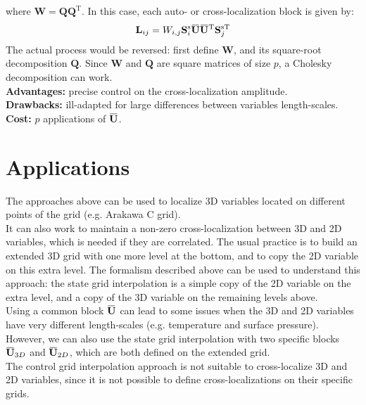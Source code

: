 \documentclass[12pt]{scrartcl}
\newcommand{\overbar}[1]{\mkern 1.5mu\overline{\mkern-1.5mu#1\mkern-1.5mu}\mkern 1.5mu}
\begin{document}
where $\mathbf{W} = \mathbf{Q} \mathbf{Q}^\textrm{T}$. In this case, each auto- or cross-localization block is given by:
\begin{align}
\mathbf{L}_{ij} = W_{i,j} \mathbf{S}^\mathrm{s}_i \overbar{\mathbf{U}} \overbar{\mathbf{U}}^\mathrm{T} \mathbf{S}_j^{\mathrm{s} \mathrm{T}}
\end{align}
The actual process would be reversed: first define $\mathbf{W}$, and its square-root decomposition $\mathbf{Q}$. Since $\mathbf{W}$ and $\mathbf{Q}$ are square matrices of size $p$, a Cholesky decomposition can work.\\
$  $\\
\textbf{Advantages:} precise control on the cross-localization amplitude.\\
\textbf{Drawbacks:} ill-adapted for large differences between variables length-scales.\\
\textbf{Cost:} $p$ applications of $\overbar{\mathbf{U}}$.

\section{Applications}
The approaches above can be used to localize 3D variables located on different points of the grid (e.g. Arakawa C grid).\\
$  $\\
It can also work to maintain a non-zero cross-localization between 3D and 2D variables, which is needed if they are correlated. The usual practice is to build an extended 3D grid with one more level at the bottom, and to copy the 2D variable on this extra level. The formalism described above can be used to understand this approach: the state grid interpolation is a simple copy of the 2D variable on the extra level, and a copy of the 3D variable on the remaining levels above.\\
$  $\\
Using a common block $\overbar{\mathbf{U}}$ can lead to some issues when the 3D and 2D variables have very different length-scales (e.g. temperature and surface pressure). However, we can also use the state grid interpolation with two specific blocks $\overbar{\mathbf{U}}_{3D}$ and $\overbar{\mathbf{U}}_{2D}$, which are both defined on the extended grid.\\
$  $\\
The control grid interpolation approach is not suitable to cross-localize 3D and 2D variables, since it is not possible to define cross-localizations on their specific grids.

\clearpage



\end{document}
